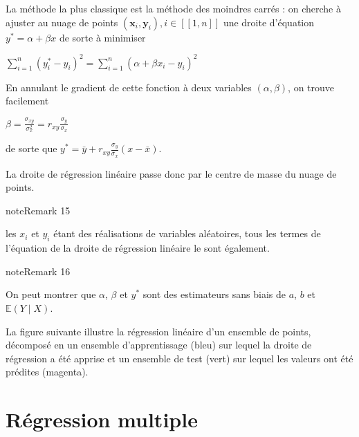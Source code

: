 \documentclass[letterpaper,10pt,french]{sphinxmanual}
\begin{document}
\sphinxAtStartPar
La méthode la plus classique est la méthode des moindres carrés : on cherche à ajuster au nuage de points  \((\mathbf x_i,\mathbf y_i),i\in[\![1,n]\!]\) une droite d’équation \(y^*=\alpha +\beta x\) de sorte à minimiser

\sphinxAtStartPar
\(\displaystyle\sum_{i=1}^n (y_i^*-y_i)^2 = \displaystyle\sum_{i=1}^n (\alpha + \beta x_i-y_i)^2\)

\sphinxAtStartPar
En annulant le gradient de cette fonction à deux variables \((\alpha,\beta)\), on trouve facilement

\sphinxAtStartPar
\(\beta = \frac{\sigma_{xy}}{\sigma_x^2} = r_{xy}\frac{\sigma_y}{\sigma_x}\)

\sphinxAtStartPar
de sorte que \(y^* = \bar y + r_{xy}\frac{\sigma_y}{\sigma_x}(x-\bar x)\).

\sphinxAtStartPar
La droite de régression linéaire passe donc par le centre de masse du nuage de points.
\label{regression:remark-2}
\begin{sphinxadmonition}{note}{Remark 15}



\sphinxAtStartPar
les \(x_i\) et \(y_i\) étant des réalisations de variables aléatoires, tous les termes de l’équation de la droite de régression linéaire le sont également.
\end{sphinxadmonition}
\label{regression:remark-3}
\begin{sphinxadmonition}{note}{Remark 16}



\sphinxAtStartPar
On peut montrer que \(\alpha\), \(\beta\) et \(y^*\) sont des estimateurs sans biais de \(a\), \(b\) et \(\mathbb{E}(Y\mid X)\).
\end{sphinxadmonition}

\sphinxAtStartPar
La figure suivante illustre la régression linéaire d’un ensemble de points, décomposé en un ensemble d’apprentissage (bleu) sur lequel la droite de régression a été apprise et un ensemble de test (vert) sur lequel les valeurs ont été prédites (magenta).

\sphinxAtStartPar
{}


\section{Régression multiple}
\label{\detokenize{regression:regression-multiple}}
\ignorespaces 
\end{document}

